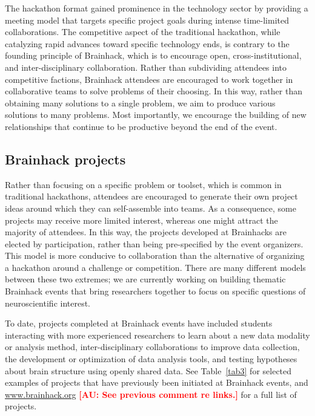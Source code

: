 \documentclass[11pt]{bmc_article_s50}
\begin{document}
The hackathon format gained prominence in the technology sector by providing a meeting model that targets specific project goals during intense time-limited collaborations. The competitive aspect of the traditional hackathon, while catalyzing rapid advances toward specific technology ends, is contrary to the founding %
principle of Brainhack, which is to encourage open, cross-institutional, and inter-disciplinary collaboration. Rather than subdividing attendees into competitive factions, Brainhack attendees are encouraged to work together in collaborative teams to solve problems of their choosing. In this way, rather than obtaining many solutions to a single problem, we aim to produce various solutions to many problems. Most importantly, we encourage the building of new relationships that continue to be productive beyond the end of the event.

\subsection*{Brainhack projects}

Rather than focusing on a specific problem or toolset, which is common in traditional hackathons, attendees are encouraged to generate their own project ideas around which they can self-assemble into teams. As a consequence, some projects may receive more limited interest, whereas %
one might attract the majority of attendees. In this way, the projects developed at Brainhacks are elected by participation, rather than being pre-specified by the event organizers. This model is more conducive to collaboration than the alternative of organizing a hackathon around a challenge or competition. There are many different models between these two extremes; %
  we are currently working on building thematic Brainhack events that bring researchers together to focus on specific questions of neuroscientific interest.

To date, projects completed at Brainhack events have %
included students interacting with more experienced researchers to learn about a new data modality or analysis method, inter-disciplinary collaborations to improve data collection, the development or optimization of data analysis tools, %
and testing hypotheses about brain structure using openly shared data. See Table~\ref{tab3} for selected examples of projects that have previously been initiated at Brainhack events, and \href{http://www.brainhack.org}{www.brainhack.org} {\textbf{\textcolor{red}{[AU: See previous comment re links.]}}} for a full list of projects.
\end{document}
